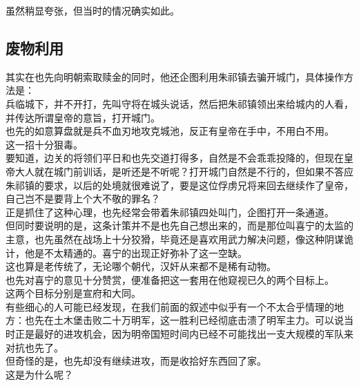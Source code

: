\begin{multicols}{\theparacolNo}
虽然稍显夸张，但当时的情况确实如此。\\

\subsection{废物利用}
其实在也先向明朝索取赎金的同时，他还企图利用朱祁镇去骗开城门，具体操作方法是：\\

兵临城下，并不开打，先叫守将在城头说话，然后把朱祁镇领出来给城内的人看，并传达所谓皇帝的意旨，打开城门。\\

也先的如意算盘就是兵不血刃地攻克城池，反正有皇帝在手中，不用白不用。\\

这一招十分狠毒。\\

要知道，边关的将领们平日和也先交道打得多，自然是不会乖乖投降的，但现在皇帝大人就在城门前训话，是听还是不听呢？打开城门自然是不行的，但如果不答应朱祁镇的要求，以后的处境就很难说了，要是这位俘虏兄将来回去继续作了皇帝，自己岂不是要背上个大不敬的罪名？\\

正是抓住了这种心理，也先经常会带着朱祁镇四处叫门，企图打开一条通道。\\

但同时要说明的是，这条计策并不是也先自己想出来的，而是那位叫喜宁的太监的主意，也先虽然在战场上十分狡猾，毕竟还是喜欢用武力解决问题，像这种阴谋诡计，他是不太精通的。喜宁的出现正好弥补了这一空缺。\\

这也算是老传统了，无论哪个朝代，汉奸从来都不是稀有动物。\\

也先对喜宁的意见十分赞赏，便准备把这一套用在他窥视已久的两个目标上。\\

这两个目标分别是宣府和大同。\\

有些细心的人可能已经发现，在我们前面的叙述中似乎有一个不太合乎情理的地方：也先在土木堡击败二十万明军，这一胜利已经彻底击溃了明军主力。可以说当时正是最好的进攻机会，因为明帝国短时间内已经不可能找出一支大规模的军队来对抗也先了。\\

但奇怪的是，也先却没有继续进攻，而是收拾好东西回了家。\\

这是为什么呢？\\


\end{multicols}
